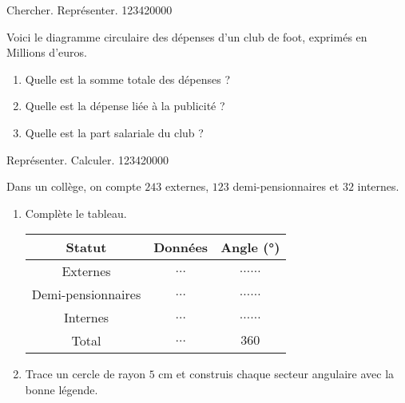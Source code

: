 \begin{pageAD} 


\begin{ExoCad}{Chercher. Représenter. }{1234}{2}{0}{0}{0}{0}

Voici le diagramme circulaire des dépenses d'un club de foot, exprimés en Millions d'euros.

\begin{minipage}{0.58\linewidth}


\end{minipage} 
\begin{minipage}{0.38\linewidth}
\begin{enumerate}[leftmargin=*]
\item Quelle est la somme totale des dépenses ? 
\item Quelle est la dépense liée à la publicité ? 
\item Quelle est la part salariale du club ? 
\end{enumerate}
\end{minipage}
\end{ExoCad} 



\begin{ExoCad}{ Représenter. Calculer. }{1234}{2}{0}{0}{0}{0}

Dans un collège, on compte $243$ externes,  $123$ demi-pensionnaires et $32$ internes.

\begin{enumerate}
\item Complète le tableau.

\begin{tabular}{|c|c|c|}\hline
Statut & Données & Angle (°) \\\hline
Externes &  $\ldots$  & $\ldots\ldots$ \\\hline
Demi-pensionnaires & $\ldots$ & $\ldots\ldots$  \\\hline
Internes & $\ldots$  & $\ldots\ldots$  \\\hline
Total &  $\ldots$ &  $360$ \\\hline
\end{tabular}

\item Trace un cercle de rayon $5$ cm et construis chaque secteur angulaire avec  la bonne légende.
\end{enumerate}
\end{ExoCad} 

\end{pageAD}


